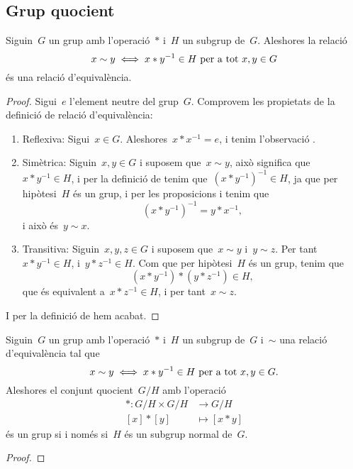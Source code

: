 \documentclass[../../main.tex]{subfiles}
\begin{document}
	\subsection{Grup quocient}
	\begin{proposition}
		\label{prop:relacio entre grups és d'equivalència}
		\label{TODO:grup quocient}
		Siguin~\(G\) un grup amb l'operació~\(\ast\) i~\(H\) un subgrup de~\(G\).
		Aleshores la relació
		\[
		    x\sim y\iff x\ast y^{-1}\in H\text{ per a tot }x,y\in G
		\]
		és una relació d'equivalència.
		\begin{proof}
			Sigui~\(e\) l'element neutre del grup~\(G\).
			Comprovem les propietats de la definició de relació d'equivalència:
			\begin{enumerate}
				\item Reflexiva: Sigui~\(x\in G\).
				Aleshores~\(x\ast x^{-1}=e\), i tenim l'observació .
				\item Simètrica: Siguin~\(x,y\in G\) i suposem que~\(x\sim y\), això significa que~\(x\ast y^{-1}\in H\), i per la definició de  tenim que~\((x\ast y^{-1})^{-1}\in H\), ja que per hipòtesi~\(H\) és un grup, i per les proposicions  i  tenim que
				\[
				    (x\ast y^{-1})^{-1}=y\ast x^{-1},
				\]
				i això és~\(y\sim x\).
				\item Transitiva: Siguin~\(x,y,z\in G\) i suposem que~\(x\sim y\) i~\(y\sim z\).
				Per tant~\(x\ast y^{-1}\in H\), i~\(y\ast z^{-1}\in H\).
				Com que per hipòtesi~\(H\) és un grup, tenim que
				\[
				    (x\ast y^{-1})\ast(y\ast z^{-1})\in H,
				\]
				que és equivalent a~\(x\ast z^{-1}\in H\), i per tant~\(x\sim z\).
			\end{enumerate}
			I per la definició de  hem acabat.
		\end{proof}
	\end{proposition}
	\begin{proposition}\label{prop:grup quocient}
		Siguin~\(G\) un grup amb l'operació~\(\ast\) i~\(H\) un subgrup de~\(G\) i~\(\sim\) una relació d'equivalència tal que
		\[
		    x\sim y\iff x\ast y^{-1}\in H\text{ per a tot }x,y\in G.
		\]
		Aleshores el conjunt quocient~\(G/H\) amb l'operació
		\begin{align*}
		\ast\colon G/H\times G/H&\longrightarrow G/H\\
		[x]\ast[y]&\longmapsto[x\ast y]
		\end{align*}
		és un grup si i només si~\(H\) és un subgrup normal de~\(G\).
		\begin{proof}
		\end{proof}
	\end{proposition}
\end{document}
